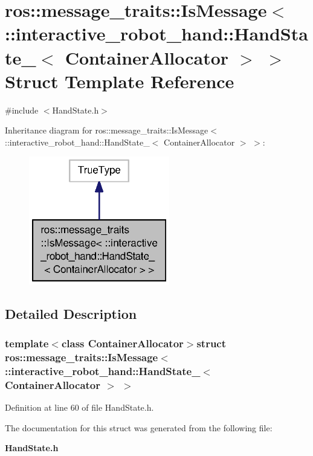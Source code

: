 \section{ros\-:\-:message\-\_\-traits\-:\-:Is\-Message$<$ \-:\-:interactive\-\_\-robot\-\_\-hand\-:\-:Hand\-State\-\_\-$<$ Container\-Allocator $>$ $>$ Struct Template Reference}
\label{structros_1_1message__traits_1_1IsMessage_3_01_1_1interactive__robot__hand_1_1HandState___3_01ContainerAllocator_01_4_01_4}


{\ttfamily \#include $<$Hand\-State.\-h$>$}



Inheritance diagram for ros\-:\-:message\-\_\-traits\-:\-:Is\-Message$<$ \-:\-:interactive\-\_\-robot\-\_\-hand\-:\-:Hand\-State\-\_\-$<$ Container\-Allocator $>$ $>$\-:
\nopagebreak
\begin{figure}[H]
\begin{center}
\leavevmode
\includegraphics[width=174pt]{structros_1_1message__traits_1_1IsMessage_3_01_1_1interactive__robot__hand_1_1HandState___3_01Co5651a0e6194fe2952e644e3b7391c006}
\end{center}
\end{figure}


\subsection{Detailed Description}
\subsubsection*{template$<$class Container\-Allocator$>$struct ros\-::message\-\_\-traits\-::\-Is\-Message$<$ \-::interactive\-\_\-robot\-\_\-hand\-::\-Hand\-State\-\_\-$<$ Container\-Allocator $>$ $>$}



Definition at line 60 of file Hand\-State.\-h.



The documentation for this struct was generated from the following file\-:\begin{DoxyCompactItemize}
\item 
{\bf Hand\-State.\-h}\end{DoxyCompactItemize}

